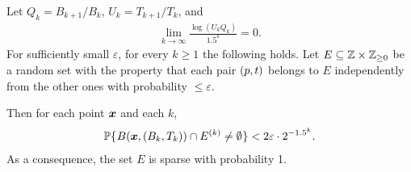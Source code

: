 \documentclass[12pt]{memoir}
\renewcommand{\le}{\leq}
\renewcommand{\ge}{\geq}
\def\B{B}
\def\U{U}
\newcommand{\Q}{Q}
\newcommand{\Tu}{T}
\begin{document}
\begin{lemma}[Sparsity]\label{lem:sparsiness}
Let \( \Q_{k} = \B_{k+1}/\B_{k} \), \( \U_{k} = \Tu_{k+1}/\Tu_{k} \), and
\begin{align}\label{eq:assumption}
  \lim_{k\rightarrow\infty}\frac{\log(\U_{k} \Q_{k})}{1.5^k}=0.
\end{align}
For sufficiently small \( \varepsilon \), for every \( k\ge 1 \) the following holds.
Let \( E\subseteq \bbZ\times \bbZ_{\ge 0} \)
be a random set with the property that each pair \( (p,t) \) belongs to \( E \)
independently from the other ones with probability \( \le \varepsilon \).

Then for each point \( \boldsymbol{x} \)  and each \( k \),
 \begin{align*}
   \Pbof{B(\vek{x},(\B_{k}, \Tu_{k}))\cap E^{(k)}\neq\emptyset} <2\varepsilon \cdot 2^{-1.5^{k}}.
 \end{align*}
As a consequence, the set \( E \) is sparse with probability 1.
\end{lemma}
\end{document}
